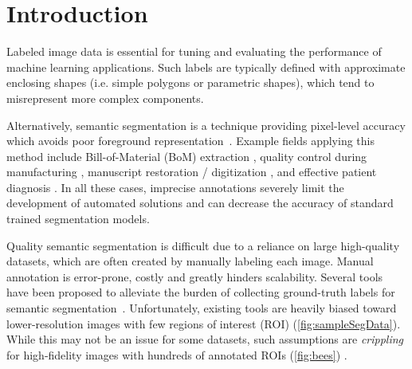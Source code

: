 \section{Introduction}
Labeled image data is essential for tuning and evaluating the performance of machine learning applications.
Such labels are typically defined with approximate enclosing shapes (i.e. simple polygons or parametric shapes), which tend to misrepresent more complex components.

Alternatively, semantic segmentation is a technique providing pixel-level accuracy which avoids poor foreground representation~\cite{chengSurveyAnalysisAutomatic2018}.
Example fields applying this method include Bill-of-Material (BoM) extraction \cite{azhaganReviewAutomaticBill2019}, quality control during manufacturing \cite{fergusonDetectionSegmentationManufacturing2018,anagnostopoulosComputerVisionApproach2001,anagnostopoulosHighPerformanceComputing2002}, manuscript restoration / digitization \cite{gatosSegmentationfreeRecognitionTechnique2004,kesimanNewSchemeText2016,jainTextSegmentationUsing1992,taxtSegmentationDocumentImages1989,fujisawaSegmentationMethodsCharacter1992}, and effective patient diagnosis \cite{seifertSemanticAnnotationMedical2010,rajchlDeepCutObjectSegmentation2017,yushkevichUserguided3DActive2006,iakovidisRatsnakeVersatileImage2014}.
In all these cases, imprecise annotations severely limit the development of automated solutions and can decrease the accuracy of standard trained segmentation models.

Quality semantic segmentation is difficult due to a reliance on large high-quality datasets, which are often created by manually labeling each image.
Manual annotation is error-prone, costly and greatly hinders scalability.
Several tools have been proposed to alleviate the burden of collecting ground-truth labels for semantic segmentation~\cite{BestImageAnnotation}.
Unfortunately, existing tools are heavily biased toward lower-resolution images with few regions of interest (ROI) (\autoref{fig:sampleSegData}).
While this may not be an issue for some datasets, such assumptions are \emph{crippling} for high-fidelity images with hundreds of annotated ROIs (\autoref{fig:bees}) \cite{Ladicky_whatWhereCombiningCRFs,Wang_multiLabelImageAnnotation}.

